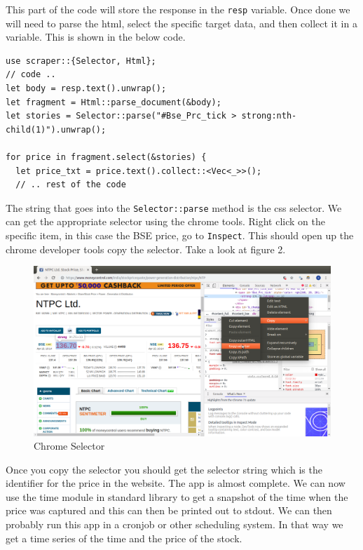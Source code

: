 \documentclass{book}
\begin{document}
This part of the code will store the response in the \lstinline{resp} variable. Once done we will need to parse the html, select the specific target data, and then collect it in a variable. This is shown in the below code.

\begin{lstlisting}[caption={chapter4\\/working\_with\_data\\/scraping\\/src\\/main\\.toml},basicstyle=\small]
use scraper::{Selector, Html};
// code ..
let body = resp.text().unwrap();
let fragment = Html::parse_document(&body);
let stories = Selector::parse("#Bse_Prc_tick > strong:nth-child(1)").unwrap();

for price in fragment.select(&stories) {
  let price_txt = price.text().collect::<Vec<_>>();
  // .. rest of the code
\end{lstlisting}

The string that goes into the \lstinline{Selector::parse} method is the css selector. We can get the appropriate selector using the chrome tools. Right click on the specific item, in this case the BSE price, go to \lstinline{Inspect}. This should open up the chrome developer tools copy the selector. Take a look at figure 2.

\begin{figure}[htpb]
	\centering
	\includegraphics[width=0.8\linewidth]{chrome_copy_selector.png}
	\caption{Chrome Selector}
	\label{fig:chrome_selector}
\end{figure}

Once you copy the selector you should get the selector string which is the identifier for the price in the website. The app is almost complete. We can now use the time module in standard library to get a snapshot of the time when the price was captured and this can then be printed out to stdout. We can then probably run this app in a cronjob or other scheduling system. In that way we get a time series of the time and the price of the stock.
\end{document}

